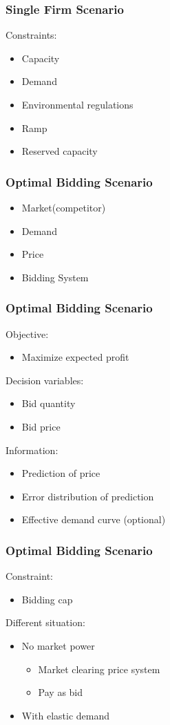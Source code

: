 \documentclass[compress,handout,10pt]{beamer}
\let\olditem\item
\renewcommand{\item}{\setlength{\itemsep}{0.5\baselineskip}\olditem}
\begin{document}
\begin{frame}
    \frametitle{Single Firm Scenario}
     Constraints:
     \begin{itemize}
     \item Capacity
     \item Demand
     \item Environmental regulations
     \item Ramp
     \item Reserved capacity
     \end{itemize}
\end{frame}

\begin{frame}
    \frametitle{Optimal Bidding Scenario}
     \begin{itemize}
     \item Market(competitor)
     \item Demand
     \item Price
     \item Bidding System
     \end{itemize}    
\end{frame}

\begin{frame}
    \frametitle{Optimal Bidding Scenario}
     Objective:
     \begin{itemize}
     \item Maximize expected profit
     \end{itemize}
     Decision variables:
     \begin{itemize}
     \item Bid quantity
     \item Bid price
     \end{itemize}  
     Information:
     \begin{itemize}
     \item Prediction of price
     \item Error distribution of prediction
     \item Effective demand curve (optional)
     \end{itemize}
\end{frame}

\begin{frame}
    \frametitle{Optimal Bidding Scenario}
     Constraint:
     \begin{itemize}
     \item Bidding cap
     \end{itemize}
     Different situation:
     \begin{itemize}
     \item No market power
          \begin{itemize}
          \item Market clearing price system
          \item Pay as bid
          \end{itemize}
     \item With elastic demand
     \end{itemize}    
\end{frame}
\end{document}
